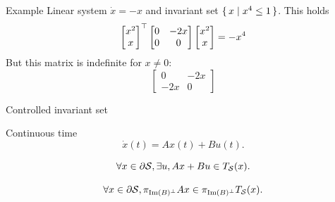 \documentclass{beamer}
\newcommand{\piB}{\pi_{\Image(B)^\perp}}
\begin{document}
\begin{frame}{Example}
  Linear system $\dot{x} = -x$ and invariant set $\{\, x \mid x^4 \le 1 \,\}$.
  This holds
  \[
    \begin{bmatrix}
      x^2\\
      x
    \end{bmatrix}^\top
    \begin{bmatrix}
      0 & -2x\\
      0 & 0
    \end{bmatrix}
    \begin{bmatrix}
      x^2\\
      x
    \end{bmatrix}
    =
    -x^4
  \]
  But this matrix is indefinite for $x \neq 0$:
  \[
    \begin{bmatrix}
      0 & -2x\\
      -2x & 0
    \end{bmatrix}
  \]

\end{frame}

\begin{frame}{Controlled invariant set}
  \begin{block}{Continuous time}
    \[ \dot{x}(t) = Ax(t) + Bu(t). \]

    \vspace{-1em}

    \[ \forall x \in \partial \mathcal{S}, \exists u, A x + B u \in T_{\mathcal{S}}(x). \]

    \vspace{-1em}

    \[ \forall x \in \partial \Sset, \piB{} A x \in \piB{} T_\Sset(x). \]
  \end{block}
\end{frame}
\end{document}
